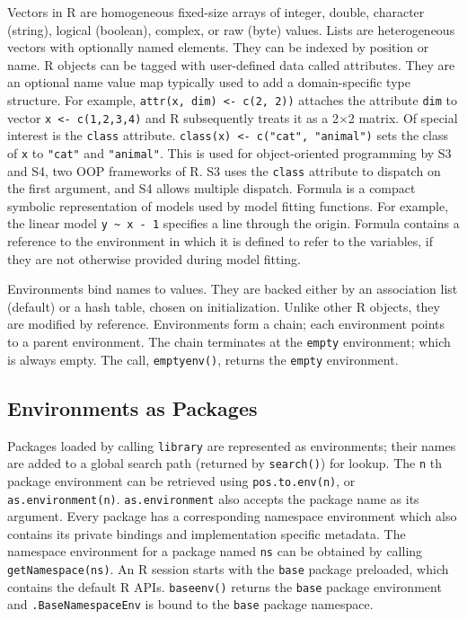 \documentclass[10pt,review,sigplan,anonymous=true,authorversion=true,nonacm=true]{acmart}
\newcommand{\code}[1]{\lstinline |#1|\xspace}
\newcommand{\asEnvironment}{\code{as.environment}}
\begin{document}
Vectors in R are homogeneous fixed-size arrays of integer, double, character
(string), logical (boolean), complex, or raw (byte) values. Lists are
heterogeneous vectors with optionally named elements. They can be indexed by
position or name. R objects can be tagged with user-defined data called
attributes. They are an optional name value map typically used to add a
domain-specific type structure. For example, \code{attr(x, dim) <- c(2, 2))}
attaches the attribute \code{dim} to vector \code{x <- c(1,2,3,4)} and R
subsequently treats it as a 2$\times$2 matrix. Of special interest is the
\code{class} attribute. \code{class(x) <- c("cat", "animal")} sets the class of
\code{x} to \code{"cat"} and \code{"animal"}. This is used for object-oriented
programming by S3 and S4, two OOP frameworks of R. S3 uses the \code{class}
attribute to dispatch on the first argument, and S4 allows multiple dispatch.
Formula is a compact symbolic representation of models used by model fitting
functions. For example, the linear model \code{y ~ x - 1} specifies a line
through the origin. Formula contains a reference to the environment in which it
is defined to refer to the variables, if they are not otherwise provided during
model fitting.

Environments bind names to values. They are backed either by an association list
(default) or a hash table, chosen on initialization. Unlike other R objects,
they are modified by reference. Environments form a chain; each environment
points to a parent environment. The chain terminates at the \code{empty}
environment; which is always empty. The call, \code{emptyenv()}, returns the
\code{empty} environment.

\subsection{Environments as Packages}

Packages loaded by calling \code{library} are represented as environments; their
names are added to a global search path (returned by \code{search()}) for
lookup. The \code{n}th package environment can be retrieved using
\code{pos.to.env(n)}, or \code{as.environment(n)}. \asEnvironment also accepts
the package name as its argument. Every package has a corresponding namespace
environment which also contains its private bindings and implementation specific
metadata. The namespace environment for a package named \code{ns} can be
obtained by calling \code{getNamespace(ns)}. An R session starts with the
\code{base} package preloaded, which contains the default R APIs.
\code{baseenv()} returns the \code{base} package environment and
\code{.BaseNamespaceEnv} is bound to the \code{base} package namespace.
\end{document}
